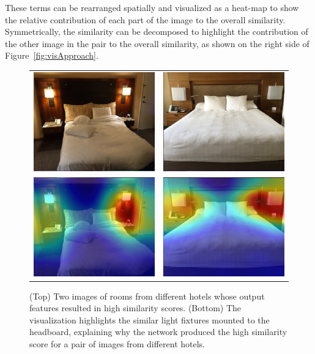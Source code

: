 \documentclass[12pt]{article}
\begin{document}
These terms can be rearranged spatially and visualized as a heat-map to show the relative contribution of each part of the image to the overall similarity. Symmetrically, the similarity can be decomposed to highlight the contribution of the other image in the pair to the overall similarity, as shown on the right side of Figure~\ref{fig:visApproach}.

\begin{figure}[t]
    \centering
    \begin{tabular}{cc}
        \includegraphics[width=.3\columnwidth]{figs/exampleVis/1_im.png} &  
        \includegraphics[width=.3\columnwidth]{figs/exampleVis/2_im.png}\\
        \includegraphics[width=.3\columnwidth]{figs/exampleVis/1_hm.png} &  
        \includegraphics[width=.3\columnwidth]{figs/exampleVis/2_hm.png}
        \end{tabular}
    \caption[Example similarity visualizations]{(Top) Two images of rooms from different hotels whose output features resulted in high similarity scores. (Bottom) The visualization highlights the similar light fixtures mounted to the headboard, explaining why the network produced the high similarity score for a pair of images from different hotels.}
    \label{fig:exampleVis}
\end{figure}
\end{document}
